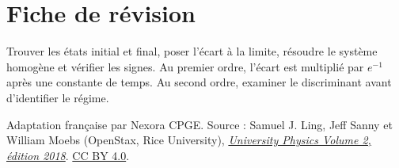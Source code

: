\documentclass[11pt,a4paper]{article}
\begin{document}
\section*{Fiche de révision}
Trouver les états initial et final, poser l’écart à la limite, résoudre le système homogène et vérifier les signes. Au premier ordre, l’écart est multiplié par $e^{-1}$ après une constante de temps. Au second ordre, examiner le discriminant avant d’identifier le régime.

\bigskip
{\footnotesize Adaptation française par Nexora CPGE. Source : Samuel J. Ling, Jeff Sanny et William Moebs (OpenStax, Rice University),
\href{https://d3bxy9euw4e147.cloudfront.net/oscms-prod/media/documents/UniversityPhysicsVolume2-OP.pdf\#page=479}{\textit{University Physics Volume 2, édition 2018}}.
\href{https://creativecommons.org/licenses/by/4.0/}{CC BY 4.0}.}
\end{document}
